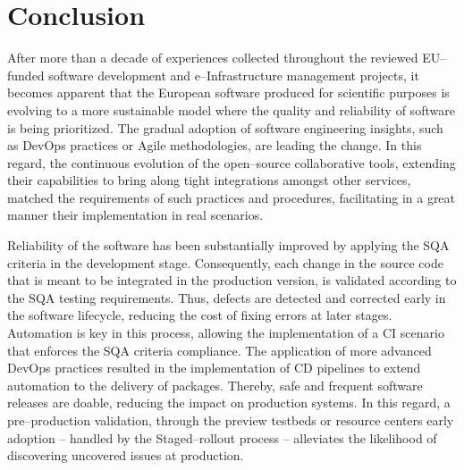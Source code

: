 \documentclass[journal]{IEEEtran}
\begin{document}
\section{Conclusion}
\label{sec:con}

After more than a decade of experiences collected throughout the reviewed
EU--funded software development and e--Infrastructure management projects, it
becomes apparent that the European software produced for scientific purposes is
evolving to a more sustainable model where the quality and reliability of
software is being prioritized. The gradual adoption of software engineering insights, such as
DevOps practices or Agile methodologies, are leading the change. In this regard, the continuous evolution of the open--source
collaborative tools, extending their capabilities to bring along tight
integrations amongst other services, matched the requirements of such practices
and procedures, facilitating in a great manner their implementation in real scenarios.

Reliability of the software has been substantially improved by applying the SQA
criteria in the development stage. Consequently, each change in the source code
that is meant to be integrated in the production version, is validated according
to the SQA testing requirements. Thus, defects are detected and corrected early in the
software lifecycle, reducing the cost of fixing errors at later stages. Automation is
key in this process, allowing the implementation of a CI scenario that enforces
the SQA criteria compliance. The application of more advanced DevOps practices
resulted in the implementation of CD pipelines to extend automation to the
delivery of packages. Thereby, safe and frequent software releases are doable, reducing
the impact on production systems. In this regard, a pre--production validation,
through the preview testbeds or resource centers early adoption -- handled by the
Staged--rollout process -- alleviates the likelihood of discovering uncovered
issues at production.
\end{document}
